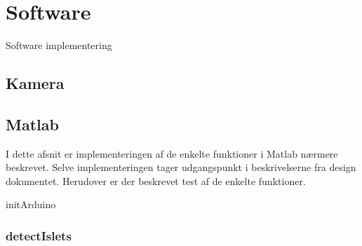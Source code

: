 \section{Software}
Software implementering
 
\subsection{Kamera}



\newpage
\subsection{Matlab}
I dette afsnit er implementeringen af de enkelte funktioner i Matlab nærmere beskrevet. Selve implementeringen tager udgangspunkt i beskrivelserne fra design dokumentet. Herudover er der beskrevet test af de enkelte funktioner.  

initArduino





\subsubsection{detectIslets} 
